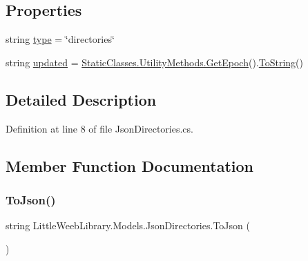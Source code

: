 \subsection*{Properties}
\begin{DoxyCompactItemize}
\item 
string \mbox{\hyperlink{class_little_weeb_library_1_1_models_1_1_json_directories_a2cc6b2f3d096a90439b9492b889921be}{type}} = \char`\"{}directories\char`\"{}
\item 
string \mbox{\hyperlink{class_little_weeb_library_1_1_models_1_1_json_directories_a674e1e3950c199b1558ba3202b66a79b}{updated}} = \mbox{\hyperlink{class_little_weeb_library_1_1_static_classes_1_1_utility_methods_a12336d9e64983ddabaad8950486fafb2}{Static\+Classes.\+Utility\+Methods.\+Get\+Epoch}}().\mbox{\hyperlink{class_little_weeb_library_1_1_models_1_1_json_directories_aef343d105a3881b4c144dc557aaf76dc}{To\+String}}()
\end{DoxyCompactItemize}


\subsection{Detailed Description}


Definition at line 8 of file Json\+Directories.\+cs.



\subsection{Member Function Documentation}
\mbox{\label{class_little_weeb_library_1_1_models_1_1_json_directories_a06826e97f8dd170ecad5574cf8ef816a}} 
\subsubsection{\texorpdfstring{To\+Json()}{ToJson()}}
{\footnotesize\ttfamily string Little\+Weeb\+Library.\+Models.\+Json\+Directories.\+To\+Json (\begin{DoxyParamCaption}{ }\end{DoxyParamCaption})}



